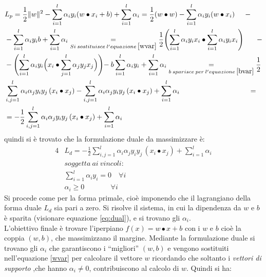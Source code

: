 \begin{equation}
\begin{split}
&L_{p} = \frac{1}{2}\lVert w\rVert^{2} - \sum_{i=1}^{l}\alpha_{i}y_{i}(w \bullet x_{i} + b) + \sum_{i=1}^{l}\alpha_{i} = \frac{1}{2}(w \bullet w) - \sum_{i=1}^{l}\alpha_{i}y_{i}(w \bullet x_{i} ) \quad\:\: -\\
 &- \sum_{i=1}^{l}\alpha_{i}y_{i}b + \sum_{i=1}^{l}\alpha_{i}
\underset{Si \:sostituisce \:l'equazione \:\eqref{wvar}}{=} \frac{1}{2} \Biggl(\sum_{i=1}^{l}\alpha_{i}y_{i}x_{i} \bullet \sum_{i=1}^{l}\alpha_{i}y_{i}x_{i} \Biggl) \quad\:\:\:\, - \\&
- \Biggl(\sum_{i=1}^{l}\alpha_{i}y_{i}\Bigl(x_{i} \bullet \sum_{j=1}^{l}\alpha_{j}y_{j}x_{j}\Bigl)\Biggl) -\:b\sum_{i=1}^{l}\alpha_{i}y_{i} + \sum_{i=1}^{l}\alpha_{i}
\underset{b \:sparisce\:per \:l'equazione\:\eqref{bvar}}{=} \frac{1}{2} \\&\sum_{i,j = 1}^{l}\alpha_{i}\alpha_{j}y_{i}y_{j}\,(x_{i} \bullet x_{j}) - 
 \sum_{i,j = 1}^{l}\alpha_{i}\alpha_{j}y_{i}y_{j}\,(x_{i} \bullet x_{j}) + \sum_{i=1}^{l}\alpha_{i} \qquad \qquad \qquad \qquad \quad\:\:\,=\\
 &= - \frac{1}{2} \sum_{i,j = 1}^{l}\alpha_{i}\alpha_{j}y_{i}y_{j}\,(x_{i} \bullet x_{j}) + \sum_{i=1}^{l}\alpha_{i}
\end{split}
\end{equation}
quindi si è trovato che la formulazione duale da massimizzare è:
\begin{alignat}{4}
& L_{d} = - \frac{1}{2} \sum_{i,j = 1}^{l}\alpha_{i}\alpha_{j}y_{i}y_{j}\,(x_{i} \bullet x_{j}) + \sum_{i=1}^{l}\alpha_{i} \label{eq:dual}\\
& soggetta \:ai\:vincoli: \nonumber\\
&\sum_{i=1}^{l}\alpha_{i}y_{i} = 0 \quad \forall i \\
&\alpha_{i} \geq 0 \qquad \quad\:\:\: \forall i
\end{alignat}
Si procede come per la forma primale,  cioè imponendo che il lagrangiano della forma duale $L_{d}$ sia pari a zero. Si risolve il sistema, in cui la dipendenza da $w$ e $b$ è sparita (visionare equazione \eqref{eq:dual}), e si trovano gli $\alpha_{i}$.\\
 L'obiettivo finale è trovare l'iperpiano $f(x) = w \bullet x +b$ con i $w \text{ e } b$ cioè la coppia $(w,b)$, che massimizzano il margine. Mediante la formulazione duale si trovano gli $\alpha_i$ che garantiscono i ``migliori'' $(w,b)$ e vengono sostituiti nell'equazione \eqref{wvar} per calcolare il vettore $w$ ricordando che soltanto i \textit{vettori di supporto} ,che hanno $\alpha_{i} \neq 0$, contribuiscono al calcolo di $w$. Quindi si ha: 
